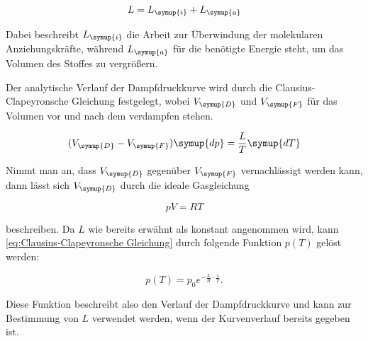 \begin{equation}
    L=L_{\symup{i}}+L_{\symup{a}}
    \label{eq:Verdampfungswärme}
\end{equation}

Dabei beschreibt $L_{\symup{i}}$ die Arbeit zur Überwindung der molekularen Anziehungskräfte, während $L_{\symup{a}}$
für die benötigte Energie steht, um das Volumen des Stoffes zu vergrößern.

Der analytische Verlauf der Dampfdruckkurve wird durch die Clausius-Clapeyronsche Gleichung festgelegt, wobei
$V_{\symup{D}}$ und $V_{\symup{F}}$ für das Volumen vor und nach dem verdampfen stehen.

\begin{equation}
    (V_{\symup{D}}-V_{\symup{F}})\symup{dp}=\frac{L}{T}\symup{dT}
    \label{eq:Clausius-Clapeyronsche Gleichung}
\end{equation}

Nimmt man an, dass $V_{\symup{D}}$ gegenüber $V_{\symup{F}}$ vernachlässigt werden kann, dann
lässt sich $V_{\symup{D}}$ durch die ideale Gasgleichung 

\begin{equation}
    pV=RT
    \label{eq:Ideale Gasgleichung}
\end{equation}

beschreiben. Da $L$ wie bereits erwähnt als konstant angenommen wird, kann \eqref{eq:Clausius-Clapeyronsche Gleichung}
durch folgende Funktion $p(T)$ gelöst werden:

\begin{equation}
    p(T)=p_0e^{-\frac{L}{R}\cdot\frac{1}{T}}.
    \label{eq:Druck}
\end{equation}

Diese Funktion beschreibt also den Verlauf der Dampfdruckkurve und kann zur Bestimmung von $L$ verwendet werden, wenn
der Kurvenverlauf bereits gegeben ist.